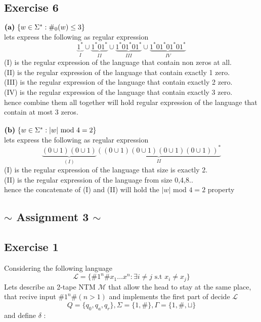 \documentclass[12pt]{article}
\begin{document}
\subsection*{Exercise 6}
$\text{\textbf{(a)} }\lbrace w \in \Sigma^*: \#_0 (w) \leq 3 \rbrace $\\
lets express the following as regular expression 
\[
 \underbrace{1^*}_{I}\cup \underbrace{1^*01^*}_{II} \cup \underbrace{1^*01^*01^*}_{III}\cup \underbrace{1^*01^*01^*01^*}_{IV} 
\]
(I) is the regular expression of the language that contain non zeros at all.
\\ (II) is the regular expression of the language that contain exactly 1 zero.
\\ (III) is the regular expression of the language that contain exactly 2 zero.
\\ (IV) is the regular expression of the language that contain exactly 3 zero.\\
hence combine them all together will hold regular expression of the language that contain at most 3 zeros.
\\\\$\text{\textbf{(b)} }\lbrace w \in \Sigma^*:|w| \text{ mod 4}=2 \rbrace $\\
lets express the following as regular expression 
\[
 \underbrace{(0 \cup 1 )(0\cup 1) }_{(I)}\underbrace{((0\cup 1)(0\cup 1)(0\cup 1)(0\cup 1))^*}_{II}
\]
(I) is the regular expression of the language that  size is exactly 2. 
\\(II) is the regular expression of the language from size 0,4,8.. \\
hence the concatenate of (I) and (II) will hold the $|w|$ mod $4=2$ property
\pagebreak
\begin{center}
\section{$\sim$ Assignment 3  $\sim$}
\end{center}
\subsection{Exercise 1}
Considering the following language\[
\mathcal{L=} \{ \# 1^n \# x_1  \ldots x^n : \exists i\neq j \text{ s.t }
x_i \neq x_j \}
\]
Lets describe an 2-tape NTM $\mathcal{M}$ that allow the head  to stay at the same place, that recive input $\# 1^n \# (n > 1)$ and  implements the first part of decide $\mathcal{L}$
\[
Q=\lbrace q_0,q_a,q_r \rbrace,\Sigma =\{ 1,\# \},\Gamma =\{ 1,\# ,\sqcup \} 
\]
and define $\delta$ :
\end{document}
